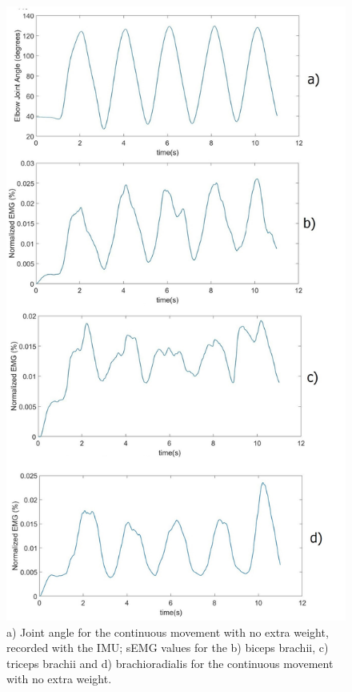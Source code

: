 \begin{figure}[thpb]
      \centering
      \includegraphics[height = 0.8\textheight]{Images/Angle_and_EMGs.jpg}
      \caption{a) Joint angle for the continuous movement with no extra weight, recorded with the IMU; sEMG values for the b) biceps brachii, c) triceps brachii and d) brachioradialis for the continuous movement with no extra weight.}
      \label{Angle and EMG}
   \end{figure}


